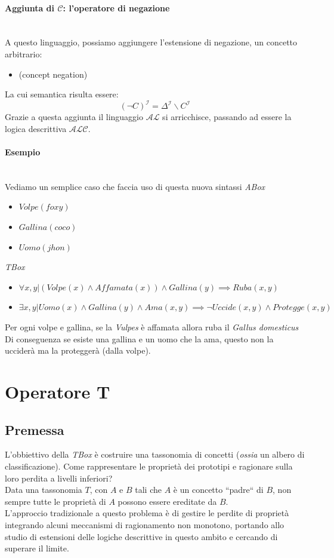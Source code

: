 \paragraph{Aggiunta di $\mathcal{C}$: l’operatore di negazione} \hfill \\
A questo linguaggio, possiamo aggiungere l’estensione di negazione, un concetto arbitrario:
\begin{itemize}
	\item[]  (concept negation)
\end{itemize}
La cui semantica risulta essere:
\[ (\neg C)^{\mathcal{I}} =  \Delta^{\mathcal{I}}\backslash C^{\mathcal{I}}\]
Grazie a questa aggiunta il linguaggio $ \mathcal{AL} $ si arricchisce, 
passando ad essere la logica descrittiva $ \mathcal{ALC} $.
\paragraph{Esempio} \hfill
\\
Vediamo un semplice caso che faccia uso di questa nuova sintassi 
\textit{ABox}
\begin{itemize}
	\item $ Volpe(foxy)$
	\item $ Gallina(coco) $
	\item $ Uomo(jhon) $
\end{itemize}
\textit{TBox}
\begin{itemize}
	\item $ \forall x,y |(Volpe(x) \land \textit{Affamata}(x)) \land Gallina(y)  \implies Ruba(x,y) $
	\item $ \exists x,y |Uomo(x) \land Gallina(y) \land Ama(x,y) \implies \neg Uccide(x,y) \land Protegge(x,y) $
\end{itemize}
Per ogni volpe e gallina, se la \textit{Vulpes} è affamata allora ruba il \textit{Gallus domesticus}
Di conseguenza se esiste una gallina e un uomo che la ama, questo non la ucciderà ma la proteggerà (dalla volpe).

\clearpage

\section{Operatore T}
\subsection{Premessa}
L'obbiettivo della \textit{TBox} è costruire una tassonomia di concetti (\textit{ossia} un albero di classificazione). 
Come rappresentare le proprietà dei prototipi e ragionare sulla loro perdita a livelli inferiori? \\
Data una tassonomia $T$, con $A$ e $B$ tali che $A$ è un concetto “padre“ di $B$, 
non sempre tutte le proprietà di $A$ possono essere ereditate da $B$.\\
L’approccio tradizionale a questo problema è di gestire le perdite di proprietà 
integrando alcuni meccanismi di ragionamento non monotono, portando allo studio di estensioni 
delle logiche descrittive in questo ambito e cercando di superare il limite.
